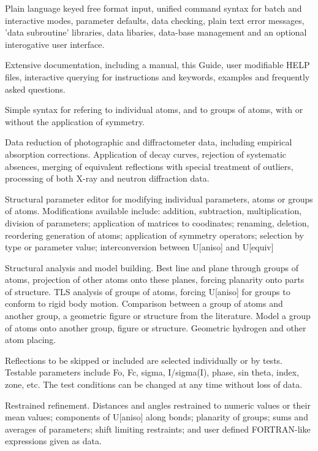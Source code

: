 \documentclass[10pt,a4paper]{report}
\begin{document}
Plain language keyed free format input, unified command syntax  for batch and interactive modes, parameter defaults, data checking, plain text error messages, 'data subroutine' libraries, data  libaries, data-base management and an optional interogative user  interface.



Extensive documentation, including a manual, this Guide, user modifiable HELP files, interactive querying for instructions  and keywords, examples and frequently asked questions.



Simple syntax for refering to individual atoms, and to groups of atoms, with or without the application of symmetry.



Data reduction of photographic and diffractometer data, including empirical absorption corrections. Application of decay curves, rejection of systematic absences, merging of equivalent reflections with special treatment of outliers, processing of both X-ray and neutron diffraction data.



Structural parameter editor for modifying individual parameters, atoms or groups of atoms. Modifications available include:  addition, subtraction, multiplication, division of parameters; application of matrices to coodinates; renaming, deletion, reordering generation of atoms; application of symmetry operators; selection by type or parameter value; interconversion between U[aniso] and U[equiv]



Structural analysis and model building. Best line and plane through groups of atoms, projection of other atoms onto these planes, forcing planarity onto parts of structure. TLS analysis of groups of atoms, forcing U[aniso] for groups to conform to rigid body motion. Comparison between a group of atoms and another group, a geometric figure or structure from the literature. Model a group of atoms onto another group, figure or structure. Geometric hydrogen and other atom placing.



Reflections to be skipped or included are selected individually or by tests. Testable parameters include Fo, Fc, sigma, I/sigma(I), phase, sin theta, index, zone, etc. The test conditions can be changed at any  time without loss of data.



Restrained refinement. Distances and angles restrained to numeric values or their mean values; components of U[aniso] along bonds; planarity of groups; sums and averages of parameters; shift limiting restraints; and user defined FORTRAN-like expressions given as data.
\end{document}
